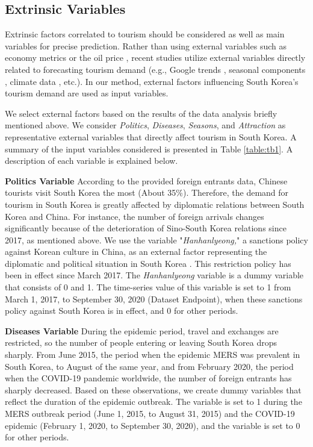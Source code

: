 \documentclass[conference]{IEEEtran}
\begin{document}
\subsection{Extrinsic Variables}\label{CV}

Extrinsic factors correlated to tourism should be considered as well as main variables for precise prediction. Rather than using external variables such as economy metrics or the oil price \cite{croes2005econometric, smeral2009impact}, recent studies utilize external variables directly related to forecasting tourism demand (e.g., Google trends \cite{dergiades2018google, onder2016forecasting}, seasonal components \cite{liu2018big}, climate data \cite{li2018relative}, etc.). In our method, external factors influencing South Korea's tourism demand are used as input variables.

We select external factors based on the results of the data analysis briefly mentioned above. We consider \textit{Politics}, \textit{Diseases}, \textit{Seasons}, and \textit{Attraction} as representative external variables that directly affect tourism in South Korea. A summary of the input variables considered is presented in Table \ref{table:tb1}. A description of each variable is explained below.

\noindent \textbf{Politics Variable} According to the provided foreign entrants data, Chinese tourists visit South Korea the most (About 35\%). Therefore, the demand for tourism in South Korea is greatly affected by diplomatic relations between South Korea and China. For instance, the number of foreign arrivals changes significantly because of the deterioration of Sino-South Korea relations since 2017, as mentioned above. We use the variable "\textit{Hanhanlyeong,}" a sanctions policy against Korean culture in China, as an external factor representing the diplomatic and political situation in South Korea \cite{meesak_2017}. This restriction policy has been in effect since March 2017. The \textit{Hanhanlyeong} variable is a dummy variable that consists of 0 and 1. The time-series value of this variable is set to 1 from March 1, 2017, to September 30, 2020 (Dataset Endpoint), when these sanctions policy against South Korea is in effect, and 0 for other periods.

\noindent \textbf{Diseases Variable} During the epidemic period, travel and exchanges are restricted, so the number of people entering or leaving South Korea drops sharply. From June 2015, the period when the epidemic MERS was prevalent in South Korea, to August of the same year, and from February 2020, the period when the COVID-19 pandemic worldwide, the number of foreign entrants has sharply decreased. Based on these observations, we create dummy variables that reflect the duration of the epidemic outbreak. The variable is set to 1 during the MERS outbreak period (June 1, 2015, to August 31, 2015) and the COVID-19 epidemic (February 1, 2020, to September 30, 2020), and the variable is set to 0 for other periods.
\end{document}
